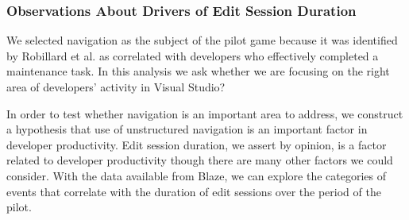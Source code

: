 \documentclass{sig-alternate}
\begin{document}
%
%
%

\subsubsection{Observations About Drivers of Edit Session Duration}

We selected navigation as the subject of the pilot game because it was identified by Robillard et al.\cite{wbsnipes:Robillard2004How} as correlated with developers who effectively completed a maintenance task.    In this analysis we ask whether we are focusing on the right area of developers' activity in Visual Studio?

In order to test whether navigation is an important area to address, we construct a hypothesis that use of unstructured navigation is an important factor in developer productivity.  Edit session duration, we assert by opinion, is a factor related to developer productivity though there are many other factors we could consider.  With the data available from Blaze, we can explore the categories of events that correlate with the duration of edit sessions over the period of the pilot.  
\end{document}
